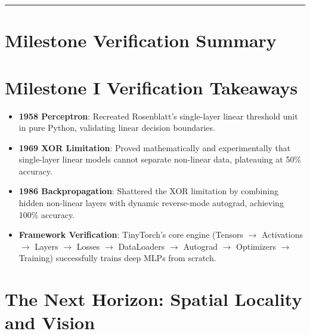 \documentclass[
  letterpaper,
]{scrbook}
\providecommand{\tightlist}{%
  \setlength{\itemsep}{0pt}\setlength{\parskip}{0pt}}
\begin{document}
\begin{center}\rule{0.5\linewidth}{0.5pt}\end{center}

\section*{Milestone Verification
Summary}\label{milestone-verification-summary}


\section*{Milestone I Verification
Takeaways}\label{milestone-i-verification-takeaways}


\begin{itemize}
\tightlist
\item
  \textbf{1958 Perceptron}: Recreated Rosenblatt's single-layer linear
  threshold unit in pure Python, validating linear decision boundaries.
\item
  \textbf{1969 XOR Limitation}: Proved mathematically and experimentally
  that single-layer linear models cannot separate non-linear data,
  plateauing at 50\% accuracy.
\item
  \textbf{1986 Backpropagation}: Shattered the XOR limitation by
  combining hidden non-linear layers with dynamic reverse-mode autograd,
  achieving 100\% accuracy.
\item
  \textbf{Framework Verification}: TinyTorch's core engine (Tensors
  \(\to\) Activations \(\to\) Layers \(\to\) Losses \(\to\) DataLoaders
  \(\to\) Autograd \(\to\) Optimizers \(\to\) Training) successfully
  trains deep MLPs from scratch.
\end{itemize}

\section*{The Next Horizon: Spatial Locality and
Vision}\label{the-next-horizon-spatial-locality-and-vision}

\end{document}
